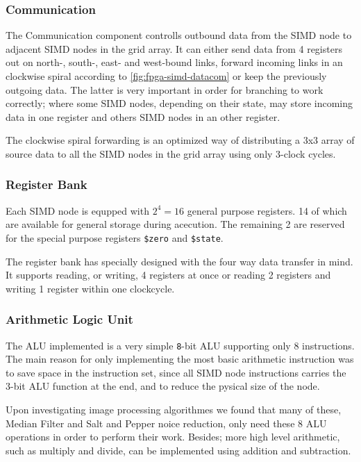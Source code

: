 \subsubsection{Communication}
The Communication component controlls outbound data from the SIMD node to adjacent SIMD nodes in the grid array. It can either send data from 4 registers out on north-, south-, east- and west-bound links, forward incoming links in an clockwise spiral according to \ref{fig:fpga-simd-datacom} or keep the previously outgoing data. The latter is very important in order for branching to work correctly; where some SIMD nodes, depending on their state, may store incoming data in one register and others SIMD nodes in an other register. 

The clockwise spiral forwarding is an optimized way of distributing a 3x3 array of source data to all the SIMD nodes in the grid array using only 3-clock cycles.

\subsubsection{Register Bank}
Each SIMD node is equpped with $2^4 = 16$ general purpose registers. 14 of which are available for general storage during acecution. The remaining 2 are reserved for the special purpose registers {\tt \$zero} and {\tt \$state}.



The register bank has specially designed with the four way data transfer in mind. It supports reading, or writing, 4 registers at once or reading 2 registers and writing 1 register within one clockcycle. 

\subsubsection{Arithmetic Logic Unit}


The ALU implemented is a very simple {\tt 8}-bit ALU supporting only 8 instructions. The main reason for only implementing the most basic arithmetic instruction was to save space in the instruction set, since all SIMD node instructions carries the 3-bit ALU function at the end, and to reduce the pysical size of the node. 


Upon investigating image processing algorithmes we found that many of these,  Median Filter and Salt and Pepper noice reduction, only need these 8 ALU operations in order to perform their work. Besides; more high level arithmetic, such as multiply and divide, can be implemented using addition and subtraction.

